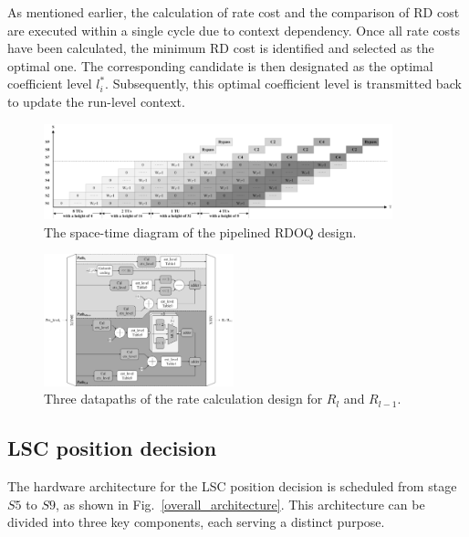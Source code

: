 \documentclass[lettersize,journal]{IEEEtran}
\begin{document}
As mentioned earlier, the calculation of rate cost and the comparison of RD cost are executed within a single cycle due to context dependency. Once all rate costs have been calculated, the minimum RD cost is identified and selected as the optimal one. The corresponding candidate is then designated as the optimal coefficient level $l_{i}^{*}$. Subsequently, this optimal coefficient level is transmitted back to update the run-level context. 
\par
\begin{figure}[!t]
	\centering
	\centerline{\includegraphics[width=0.90\textwidth]{figure/timing diagram.png}} 
	\caption{The space-time diagram of the pipelined RDOQ design.}
	\label{timing diagram} %
\end{figure}

\begin{figure}[!b]
	\centering
	\centerline{\includegraphics[width=0.49\textwidth]{figure/rate_calculation.png}} 
	\caption{Three datapaths of the rate calculation design for $R_{l}$ and $R_{l-1}$.}
	\label{rate cost} %
\end{figure}

\subsection{LSC position decision}

The hardware architecture for the LSC position decision is scheduled from stage $S5$ to $S9$, as shown in Fig.~\ref{overall_architecture}. This architecture can be divided into three key components, each serving a distinct purpose. 
\end{document}
